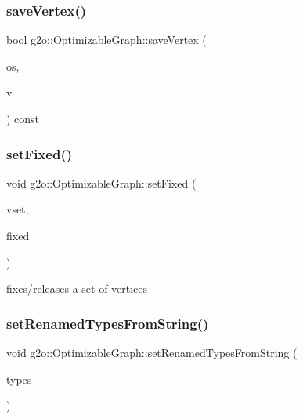 \subsubsection{\texorpdfstring{save\+Vertex()}{saveVertex()}}
{\footnotesize\ttfamily bool g2o\+::\+Optimizable\+Graph\+::save\+Vertex (\begin{DoxyParamCaption}\item[{std\+::ostream \&}]{os,  }\item[{\mbox{\hyperlink{classg2o_1_1_optimizable_graph_1_1_vertex}{Optimizable\+Graph\+::\+Vertex}} $\ast$}]{v }\end{DoxyParamCaption}) const}

\mbox{\label{structg2o_1_1_optimizable_graph_a07514f6186d19b6d893a771c0bb6abf9}} 
\subsubsection{\texorpdfstring{set\+Fixed()}{setFixed()}}
{\footnotesize\ttfamily void g2o\+::\+Optimizable\+Graph\+::set\+Fixed (\begin{DoxyParamCaption}\item[{\mbox{\hyperlink{classg2o_1_1_hyper_graph_a703938cdb4bb636860eed55a2489d70c}{Hyper\+Graph\+::\+Vertex\+Set}} \&}]{vset,  }\item[{bool}]{fixed }\end{DoxyParamCaption})\hspace{0.3cm}{\ttfamily [virtual]}}



fixes/releases a set of vertices 

\mbox{\label{structg2o_1_1_optimizable_graph_afaa77a4624619237563fe94cfd7b76fd}} 
\subsubsection{\texorpdfstring{set\+Renamed\+Types\+From\+String()}{setRenamedTypesFromString()}}
{\footnotesize\ttfamily void g2o\+::\+Optimizable\+Graph\+::set\+Renamed\+Types\+From\+String (\begin{DoxyParamCaption}\item[{const std\+::string \&}]{types }\end{DoxyParamCaption})}

